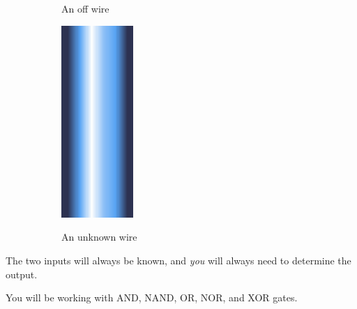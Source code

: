 \documentclass[12pt]{book}
\begin{document}
\begin{figure}[h]
\begin{subfigure}[t]{0.3\textwidth}
					An off wire
				\end{subfigure}
				\hspace{1mm}
				\begin{subfigure}[t]{0.3\textwidth}
					\centering
					\includegraphics[width=0.3\textwidth]{UNKNOWN}

					An unknown wire
				\end{subfigure}
			\end{figure}

			The two inputs will always be known, and \emph{you} will always need to determine the output.

			You will be working with AND, NAND, OR, NOR, and XOR gates.
\end{document}
